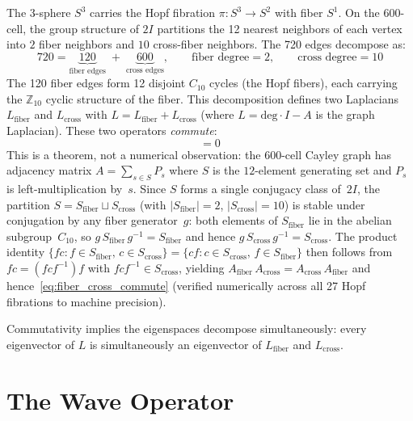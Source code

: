 \documentclass[12pt,a4paper]{article}
\theoremstyle{definition}
\begin{document}
The 3-sphere $S^3$ carries the Hopf fibration $\pi: S^3 \to S^2$ with fiber $S^1$.  On the 600-cell, the group structure of $2I$ partitions the 12 nearest neighbors of each vertex into $2$ fiber neighbors and $10$ cross-fiber neighbors.  The 720 edges decompose as:
\begin{equation}
720 = \underbrace{120}_{\text{fiber edges}} \;+\; \underbrace{600}_{\text{cross edges}}, \qquad
\text{fiber degree} = 2, \qquad \text{cross degree} = 10
\end{equation}
The 120 fiber edges form 12 disjoint $C_{10}$ cycles (the Hopf fibers), each carrying the $\mathbb{Z}_{10}$ cyclic structure of the fiber.  This decomposition defines two Laplacians $L_{\mathrm{fiber}}$ and $L_{\mathrm{cross}}$ with $L = L_{\mathrm{fiber}} + L_{\mathrm{cross}}$ (where $L = \mathrm{deg}\cdot I - A$ is the graph Laplacian).  These two operators \emph{commute}:
\begin{equation}
[L_{\mathrm{fiber}},\, L_{\mathrm{cross}}] = 0
\label{eq:fiber_cross_commute}
\end{equation}
This is a theorem, not a numerical observation: the 600-cell Cayley graph has adjacency matrix $A = \sum_{s \in S} P_s$ where $S$ is the $12$-element generating set and $P_s$ is left-multiplication by~$s$.  Since $S$ forms a single conjugacy class of~$2I$, the partition $S = S_{\mathrm{fiber}} \sqcup S_{\mathrm{cross}}$ (with $|S_{\mathrm{fiber}}| = 2$, $|S_{\mathrm{cross}}| = 10$) is stable under conjugation by any fiber generator~$g$: both elements of $S_{\mathrm{fiber}}$ lie in the abelian subgroup~$C_{10}$, so $g\,S_{\mathrm{fiber}}\,g^{-1} = S_{\mathrm{fiber}}$ and hence $g\,S_{\mathrm{cross}}\,g^{-1} = S_{\mathrm{cross}}$.  The product identity $\{fc : f \!\in\! S_{\mathrm{fiber}},\, c \!\in\! S_{\mathrm{cross}}\} = \{cf : c \!\in\! S_{\mathrm{cross}},\, f \!\in\! S_{\mathrm{fiber}}\}$ then follows from $fc = (fcf^{-1})f$ with $fcf^{-1} \in S_{\mathrm{cross}}$, yielding $A_{\mathrm{fiber}}\,A_{\mathrm{cross}} = A_{\mathrm{cross}}\,A_{\mathrm{fiber}}$ and hence~\eqref{eq:fiber_cross_commute} (verified numerically across all 27 Hopf fibrations to machine precision).

Commutativity implies the eigenspaces decompose simultaneously: every eigenvector of $L$ is simultaneously an eigenvector of $L_{\mathrm{fiber}}$ and $L_{\mathrm{cross}}$.


\section{The Wave Operator}
\label{sec:operator}
\end{document}
